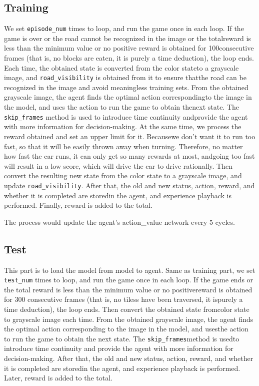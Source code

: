 \documentclass{article}
\begin{document}
\subsection{Training}
We set \texttt{episode\_num} times to loop, and run the game once in each loop. If the 
game is over or the road cannot be recognized in the image or the totalreward is less 
than the minimum value or no positive reward is obtained for 100consecutive frames 
(that is, no blocks are eaten, it is purely a time deduction), the loop ends. Each time, 
the obtained state is converted from the color stateto a grayscale image, and 
\texttt{road\_visibility} is obtained from it to ensure thatthe road can be recognized 
in the image and avoid meaningless training sets. From the obtained grayscale image, 
the agent finds the optimal action correspondingto the image in the model, and uses 
the action to run the game to obtain thenext state. The \texttt{skip\_frames} method 
is used to introduce time continuity andprovide the agent with more information for 
decision-making. At the same time, we process the reward obtained and set an upper 
limit for it. Becausewe don't want it to run too fast, so that it will be easily 
thrown away when turning. Therefore, no matter how fast the car runs, it can only get 
so many rewards at most, andgoing too fast will result in a low score, which will drive 
the car to drive rationally. Then convert the resulting new state from the color 
state to a grayscale image, and update \texttt{road\_visibility}. After that, the 
old and new status, action, reward, and whether it is completed are storedin the 
agent, and experience playback is performed. Finally, reward is added to the total. 

The process would update the agent's action\_value network every 5 cycles.

\subsection{Test}
This part is to load the model from model to agent. Same as training part, we set 
\texttt{test\_num} times to loop, and run the game once in each loop. If the game ends 
or the total reward is less than the minimum value or no positivereward is obtained 
for 300 consecutive frames (that is, no tiless have been traversed, it ispurely a 
time deduction), the loop ends. Then convert the obtained state fromcolor state to 
grayscale image each time. From the obtained grayscale image, the agent finds the 
optimal action corresponding to the image in the model, and usesthe action to run 
the game to obtain the next state. The \texttt{skip\_frames}method is usedto 
introduce time continuity and provide the agent with more information for decision-making. 
After that, the old and new status, action, reward, and whether it is completed are 
storedin the agent, and experience playback is performed. Later, reward is added to the total.
\end{document}
